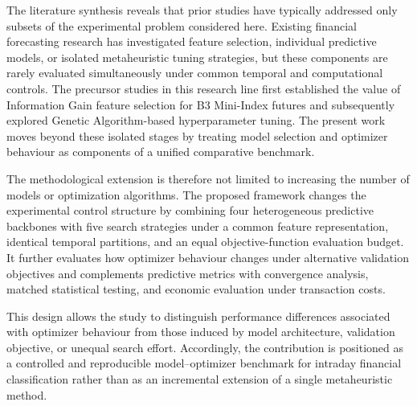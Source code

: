 The literature synthesis reveals that prior studies have typically addressed only subsets of the experimental problem considered here. Existing financial forecasting research has investigated feature selection, individual predictive models, or isolated metaheuristic tuning strategies, but these components are rarely evaluated simultaneously under common temporal and computational controls. The precursor studies in this research line first established the value of Information Gain feature selection for B3 Mini-Index futures and subsequently explored Genetic Algorithm-based hyperparameter tuning. The present work moves beyond these isolated stages by treating model selection and optimizer behaviour as components of a unified comparative benchmark.

The methodological extension is therefore not limited to increasing the number of models or optimization algorithms. The proposed framework changes the experimental control structure by combining four heterogeneous predictive backbones with five search strategies under a common feature representation, identical temporal partitions, and an equal objective-function evaluation budget. It further evaluates how optimizer behaviour changes under alternative validation objectives and complements predictive metrics with convergence analysis, matched statistical testing, and economic evaluation under transaction costs.

This design allows the study to distinguish performance differences associated with optimizer behaviour from those induced by model architecture, validation objective, or unequal search effort. Accordingly, the contribution is positioned as a controlled and reproducible model--optimizer benchmark for intraday financial classification rather than as an incremental extension of a single metaheuristic method.
